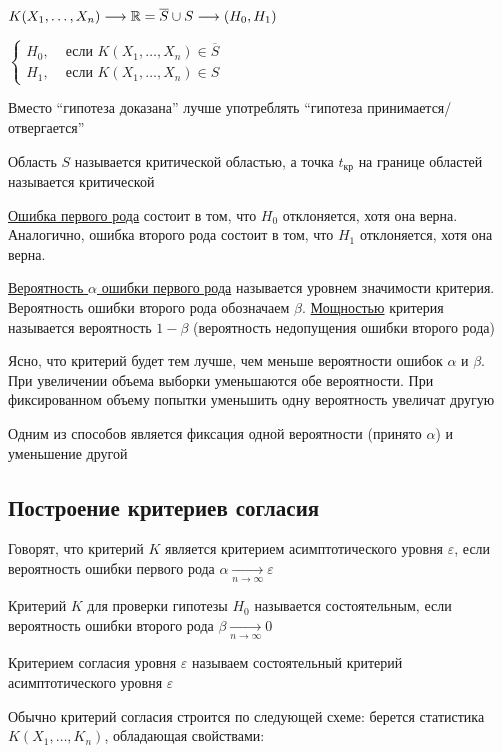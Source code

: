 \documentclass[12pt]{article}
\begin{document}
$K(X_1, \dots, X_n) \longrightarrow \mathbb{R} = \overline{S} \cup S \longrightarrow (H_0, H_1)$

$\begin{cases}
    H_0, & \text{ если } K(X_1, \dots, X_n) \in \overline{S} \\
    H_1, & \text{ если } K(X_1, \dots, X_n) \in S
\end{cases}$

Вместо \enquote{гипотеза доказана} лучше употреблять \enquote{гипотеза принимается/отвергается}

Область $S$ называется критической областью, а точка $t_\text{кр}$ на границе областей называется критической

\Def \underline{Ошибка первого рода} состоит в том, что $H_0$ отклоняется, хотя она верна. 
Аналогично, ошибка второго рода состоит в том, что $H_1$ отклоняется, хотя она верна.

\Defs \underline{Вероятность $\alpha$ ошибки первого рода} называется уровнем значимости критерия. 
Вероятность ошибки второго рода обозначаем $\beta$. \underline{Мощностью} критерия называется вероятность $1 - \beta$ (вероятность
недопущения ошибки второго рода)

Ясно, что критерий будет тем лучше, чем меньше вероятности ошибок $\alpha$ и $\beta$. При увеличении объема
выборки уменьшаются обе вероятности. При фиксированном объему попытки уменьшить одну вероятность
увеличат другую

Одним из способов является фиксация одной вероятности (принято $\alpha$) и уменьшение другой

\subsection{Построение критериев согласия}

\Def Говорят, что критерий $K$ является критерием асимптотического уровня $\varepsilon$, если 
вероятность ошибки первого рода $\alpha \underset{n \to \infty}{\longrightarrow} \varepsilon$

\Defs Критерий $K$ для проверки гипотезы $H_0$ называется состоятельным, если вероятность ошибки второго рода
$\beta \underset{n \to \infty}{\longrightarrow} 0$

\Defs Критерием согласия уровня $\varepsilon$ называем состоятельный критерий асимптотического уровня
$\varepsilon$

Обычно критерий согласия строится по следующей схеме: берется статистика $K(X_1, \dots, K_n)$, 
обладающая свойствами:
\end{document}
